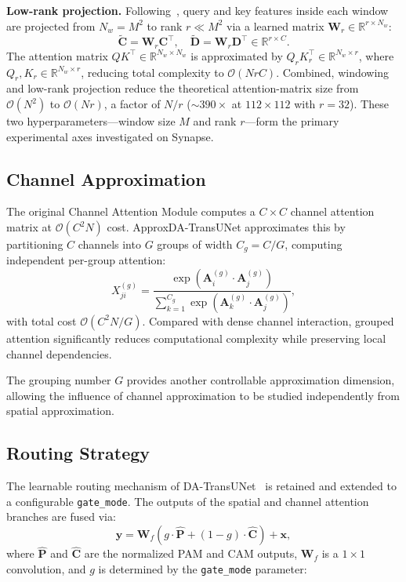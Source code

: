 \textbf{Low-rank projection.} Following~\cite{wang2020linformer}, query and key features inside each window are projected from $N_w {=} M^2$ to rank $r \ll M^2$ via a learned matrix $\mathbf{W}_r \in \mathbb{R}^{r \times N_w}$:
\begin{equation}
  \tilde{\mathbf{C}} = \mathbf{W}_r \mathbf{C}^\top, \quad \tilde{\mathbf{D}} = \mathbf{W}_r \mathbf{D}^\top \in \mathbb{R}^{r \times C}.
  \label{eq:lowrank}
\end{equation}
The attention matrix $QK^\top \in \mathbb{R}^{N_w \times N_w}$ is approximated by $Q_r K_r^\top \in \mathbb{R}^{N_w \times r}$, where $Q_r, K_r \in \mathbb{R}^{N_w \times r}$, reducing total complexity to $\mathcal{O}(NrC)$. Combined, windowing and low-rank projection reduce the theoretical attention-matrix size from $\mathcal{O}(N^2)$ to $\mathcal{O}(Nr)$, a factor of $N/r$ (${\sim}390{\times}$ at $112{\times}112$ with $r{=}32$). These two hyperparameters---window size $M$ and rank $r$---form the primary experimental axes investigated on Synapse.

\subsection{Channel Approximation}

The original Channel Attention Module computes a $C{\times}C$ channel attention matrix at $\mathcal{O}(C^2N)$ cost. ApproxDA-TransUNet approximates this by partitioning $C$ channels into $G$ groups of width $C_g = C/G$, computing independent per-group attention:
\begin{equation}
  X^{(g)}_{ji} = \frac{\exp(\mathbf{A}^{(g)}_i \cdot \mathbf{A}^{(g)}_j)}{\sum_{k=1}^{C_g}\exp(\mathbf{A}^{(g)}_k \cdot \mathbf{A}^{(g)}_j)},
  \label{eq:groupedcam}
\end{equation}
with total cost $\mathcal{O}(C^2N/G)$. Compared with dense channel interaction, grouped attention significantly reduces computational complexity while preserving local channel dependencies.

The grouping number $G$ provides another controllable approximation dimension, allowing the influence of channel approximation to be studied independently from spatial approximation.

\subsection{Routing Strategy}

The learnable routing mechanism of DA-TransUNet~\cite{sun2024datransunet} is retained and extended to a configurable \texttt{gate\_mode}. The outputs of the spatial and channel attention branches are fused via:
\begin{equation}
  \mathbf{y} = \mathbf{W}_f\!\left(g \cdot \hat{\mathbf{P}} + (1-g) \cdot \hat{\mathbf{C}}\right) + \mathbf{x},
  \label{eq:fusion}
\end{equation}
where $\hat{\mathbf{P}}$ and $\hat{\mathbf{C}}$ are the normalized PAM and CAM outputs, $\mathbf{W}_f$ is a $1{\times}1$ convolution, and $g$ is determined by the \texttt{gate\_mode} parameter:

